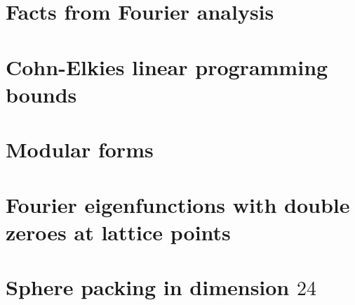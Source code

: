 \pagebreak
\section{Facts from Fourier analysis}  %


\pagebreak
\section{Cohn-Elkies linear programming bounds}


\pagebreak
\section{Modular forms}


\pagebreak
\section{Fourier eigenfunctions with double zeroes at lattice points}\label{sec: fourier double zeroes}





\pagebreak
\section{Sphere packing in dimension $24$}





